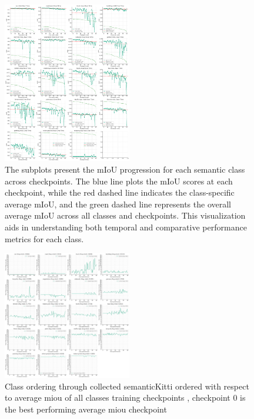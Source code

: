 \documentclass[10pt,twocolumn,letterpaper]{article}
\begin{document}
\begin{figure}[!h]
    \centering
    \includegraphics[width=0.5\textwidth]{photos/class miou vs epoch ordered by average miou desc.png}
    \caption{The subplots present the mIoU progression for each semantic class across checkpoints. The blue line plots the mIoU scores at each checkpoint, while the red dashed line indicates the class-specific average mIoU, and the green dashed line represents the overall average mIoU across all classes and checkpoints. This visualization aids in understanding both temporal and comparative performance metrics for each class.}
    \label{fig:photo_example}
\end{figure}



\begin{figure}[!h]
    \centering
    \includegraphics[width=0.5\textwidth]{photos/class ordering accross semantickitti checkpoints.png}
    \caption{Class ordering through collected semanticKitti ordered with respect to average miou of all classes training checkpoints , checkpoint 0 is the best performing average miou checkpoint  }
    \label{fig:photo_example}
\end{figure}
\end{document}
